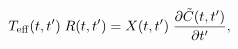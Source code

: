 \begin{equation} 
T_{\rm eff}(t,t') \; R(t,t')=X(t,t') \; 
\frac{\partial \tilde{C}(t,t')}{\partial t'}, 
\end{equation} 
